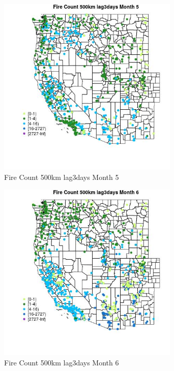 \begin{figure} 
\centering  
\includegraphics[width=0.77\textwidth]{Code_Outputs/Report_ML_input_PM25_Step4_part_f_de_duplicated_aves_prioritize_24hr_obswNAs_MapObsMo5Fire_Count_500km_lag3days.jpg} 
\caption{\label{fig:Report_ML_input_PM25_Step4_part_f_de_duplicated_aves_prioritize_24hr_obswNAsMapObsMo5Fire_Count_500km_lag3days}Fire Count 500km lag3days Month 5} 
\end{figure} 
 

\begin{figure} 
\centering  
\includegraphics[width=0.77\textwidth]{Code_Outputs/Report_ML_input_PM25_Step4_part_f_de_duplicated_aves_prioritize_24hr_obswNAs_MapObsMo6Fire_Count_500km_lag3days.jpg} 
\caption{\label{fig:Report_ML_input_PM25_Step4_part_f_de_duplicated_aves_prioritize_24hr_obswNAsMapObsMo6Fire_Count_500km_lag3days}Fire Count 500km lag3days Month 6} 
\end{figure} 
 

